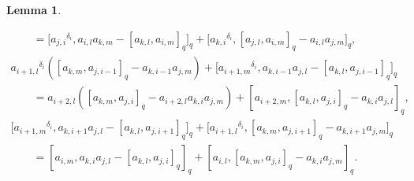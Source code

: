 \documentclass[pdftex]{sigma}
\numberwithin{equation}{section}
\def\lr#1{\left[#1\right]}
\def\d{\delta}
\newtheorem{Lemma}[Theorem]{Lemma}
\begin{document}
\begin{Lemma}
\begin{enumerate}
\begin{gather}
\qquad
=\bigl[{a_{j,i}}^{\d_i},a_{i,l}a_{k,m}-\lr{a_{k,l},a_{i,m}}_q\bigr]_q +\bigl[{a_{k,i}}^{\d_i},\lr{a_{j,l},a_{i,m}}_q-a_{i,l}a_{j,m}\bigr]_q, \label{eqn:j2}\\
{a_{i+1,l}}^{\d_i}(\lr{a_{k,m},a_{j,i-1}}_q-a_{k,i-1}a_{j,m})+\bigl[{a_{i+1,m}}^{\d_i}, a_{k,i-1}a_{j,l}-\lr{a_{k,l},a_{j,i-1}}_q\bigr]_q \nonumber \\
\qquad
=a_{i+2,l}(\lr{a_{k,m}, a_{j,i}}_q -a_{i+2,l}a_{k,i}a_{j,m})+[a_{i+2,m}, \lr{a_{k,l},a_{j,i}}_q-a_{k,i}a_{j,l}]_q, \label{eqn:j3}\\
\bigl[{a_{i+1,m}}^{\d_i},a_{k,i+1}a_{j,l}-\lr{a_{k,l},a_{j,i+1}}_q\bigr]_q +\bigl[{a_{i+1,l}}^{\d_i},\lr{a_{k,m},a_{j,i+1}}_q-a_{k,i+1}a_{j,m}\bigr]_q \nonumber \\
\qquad
=[a_{i,m},a_{k,i}a_{j,l} -\lr{a_{k,l},a_{j,i}}_q]_q +[a_{i,l},\lr{a_{k,m},a_{j,i}}_q-a_{k,i}a_{j,m}]_q. \label{eqn:j4}
\end{gather}
\end{enumerate}
\end{Lemma}
\end{document}
